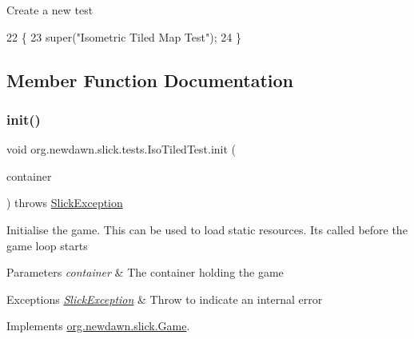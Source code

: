 Create a new test 
\begin{DoxyCode}
22                           \{
23         super(\textcolor{stringliteral}{"Isometric Tiled Map Test"});
24     \}
\end{DoxyCode}


\subsection{Member Function Documentation}
\mbox{\label{classorg_1_1newdawn_1_1slick_1_1tests_1_1_iso_tiled_test_a8933b259f16c538ca712268d4254f24c}} 
\subsubsection{\texorpdfstring{init()}{init()}}
{\footnotesize\ttfamily void org.\+newdawn.\+slick.\+tests.\+Iso\+Tiled\+Test.\+init (\begin{DoxyParamCaption}\item[{\mbox{\hyperlink{classorg_1_1newdawn_1_1slick_1_1_game_container}{Game\+Container}}}]{container }\end{DoxyParamCaption}) throws \mbox{\hyperlink{classorg_1_1newdawn_1_1slick_1_1_slick_exception}{Slick\+Exception}}\hspace{0.3cm}{\ttfamily [inline]}}

Initialise the game. This can be used to load static resources. It\textquotesingle{}s called before the game loop starts


\begin{DoxyParams}{Parameters}
{\em container} & The container holding the game \\
\hline
\end{DoxyParams}

\begin{DoxyExceptions}{Exceptions}
{\em \mbox{\hyperlink{classorg_1_1newdawn_1_1slick_1_1_slick_exception}{Slick\+Exception}}} & Throw to indicate an internal error \\
\hline
\end{DoxyExceptions}


Implements \mbox{\hyperlink{interfaceorg_1_1newdawn_1_1slick_1_1_game_ad2dd6affab08bb8fdb5fab0815957b7a}{org.\+newdawn.\+slick.\+Game}}.



